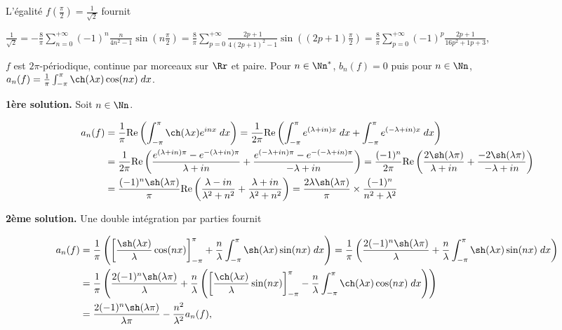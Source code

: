{{L'égalité $f\left(\frac{\pi}{2}\right)=\frac{1}{\sqrt{2}}$ fournit 

\begin{center}
$\frac{1}{\sqrt{2}}=-\frac{8}{\pi}\sum_{n=0}^{+\infty}(-1)^n\frac{n}{4n^2-1}\sin\left(n\frac{\pi}{2}\right)=\frac{8}{\pi}\sum_{p=0}^{+\infty}\frac{2p+1}{4(2p+1)^2-1}\sin\left((2p+1)\frac{\pi}{2}\right)=\frac{8}{\pi}\sum_{p=0}^{+\infty}(-1)^p\frac{2p+1}{16p^2+1p+3}$,
\end{center}

\begin{center}
\end{center}
$f$ est $2\pi$-périodique, continue par morceaux sur $\Rr$ et paire. Pour $n\in\Nn^*$, $b_n(f)=0$ puis pour $n\in\Nn$, $a_n(f)=\frac{1}{\pi}\int_{-\pi}^{\pi}\ch(\lambda x)\cos(nx)\;dx$.

\textbf{1ère solution.} Soit $n\in\Nn$.

\begin{align*}\ensuremath
a_n(f)&=\frac{1}{\pi}\text{Re}\left(\int_{-\pi}^{\pi}\ch(\lambda x)e^{inx}\;dx\right)=\frac{1}{2\pi}\text{Re}\left(\int_{-\pi}^{\pi}e^{(\lambda+in)x}\;dx+\int_{-\pi}^{\pi}e^{(-\lambda+in)x}\;dx\right)\\
 &=\frac{1}{2\pi}\text{Re}\left(\frac{e^{(\lambda+in)\pi}-e^{-(\lambda+in)\pi}}{\lambda+in}+\frac{e^{(-\lambda+in)\pi}-e^{-(-\lambda+in)\pi}}{-\lambda+in}\right)=\frac{(-1)^n}{2\pi}\text{Re}\left(\frac{2\sh(\lambda\pi)}{\lambda+in}+\frac{-2\sh(\lambda\pi)}{-\lambda+in}\right)\\
 &=\frac{(-1)^n\sh(\lambda\pi)}{\pi}\text{Re}\left(\frac{\lambda-in}{\lambda^2+n^2}+\frac{\lambda+in}{\lambda^2+n^2}\right)=\frac{2\lambda\sh(\lambda\pi)}{\pi}\times\frac{(-1)^n}{n^2+\lambda^2}
\end{align*}

\textbf{2ème solution.} Une double intégration par parties fournit

\begin{align*}\ensuremath
a_n(f)&=\frac{1}{\pi}\left(\left[\frac{\sh(\lambda x)}{\lambda}\cos(nx)\right]_{-\pi}^{\pi}+\frac{n}{\lambda}\int_{-\pi}^{\pi}\sh(\lambda x)\sin(nx)\;dx\right)=\frac{1}{\pi}\left(\frac{2(-1)^n\sh(\lambda\pi)}{\lambda}+\frac{n}{\lambda}\int_{-\pi}^{\pi}\sh(\lambda x)\sin(nx)\;dx\right)\\
 &=\frac{1}{\pi}\left(\frac{2(-1)^n\sh(\lambda\pi)}{\lambda}+\frac{n}{\lambda}\left(\left[\frac{\ch(\lambda x)}{\lambda}\sin(nx)\right]_{-\pi}^{\pi}-\frac{n}{\lambda}\int_{-\pi}^{\pi}\ch(\lambda x)\cos(nx)\;dx\right)\right)\\
 &=\frac{2(-1)^n\sh(\lambda\pi)}{\lambda\pi}-\frac{n^2}{\lambda^2}a_n(f),
\end{align*}

}}

